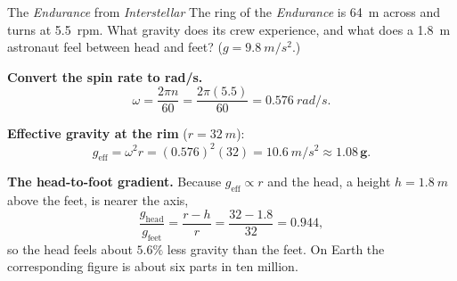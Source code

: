 \begin{figure}[htbp]
\centering
{}
\end{figure}

\begin{exbox}{The \emph{Endurance} from \emph{Interstellar}}
The ring of the \emph{Endurance} is \SI{64}{m} across and turns at \SI{5.5}{rpm}. What gravity does its
crew experience, and what does a \SI{1.8}{m} astronaut feel between head and feet? ($g=\SI{9.8}{m/s^2}$.)

 \textbf{Convert the spin rate to \si{rad/s}.}
\[
\omega=\frac{2\pi n}{60}=\frac{2\pi(5.5)}{60}=\SI{0.576}{rad/s}.
\]

 \textbf{Effective gravity at the rim} ($r=\SI{32}{m}$):
\[
g_{\text{eff}}=\omega^{2}r=(0.576)^{2}(32)=\SI{10.6}{m/s^2}\approx\mathbf{1.08\,g}.
\]

 \textbf{The head-to-foot gradient.} Because $g_{\text{eff}}\propto r$ and the head, a height
$h=\SI{1.8}{m}$ above the feet, is nearer the axis,
\[
\frac{g_{\text{head}}}{g_{\text{feet}}}=\frac{r-h}{r}=\frac{32-1.8}{32}=0.944,
\]
so the head feels about $\mathbf{5.6\%}$ less gravity than the feet. On Earth the corresponding figure
is about six parts in ten million. 
\end{exbox}

